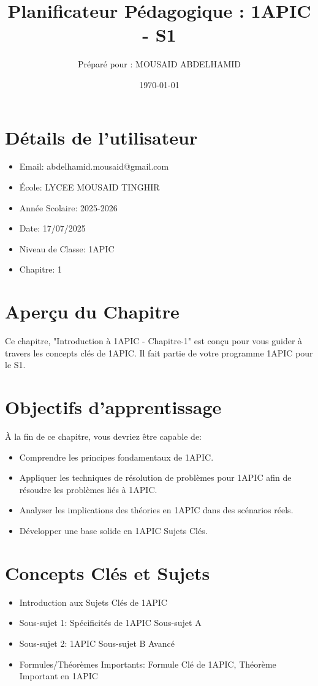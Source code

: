 \documentclass{article}
\title{Planificateur Pédagogique : 1APIC - S1}
\author{Préparé pour : MOUSAID ABDELHAMID}
\date{\today}
\begin{document}
\maketitle

\section*{Détails de l'utilisateur}
\begin{itemize}
    \item Email: abdelhamid.mousaid@gmail.com
    \item École: LYCEE MOUSAID TINGHIR
    \item Année Scolaire: 2025-2026
    \item Date: 17/07/2025
    \item Niveau de Classe: 1APIC
    \item Chapitre: 1
\end{itemize}

\section*{Aperçu du Chapitre}
Ce chapitre, "Introduction à 1APIC - Chapitre-1" est conçu pour vous guider à travers les concepts clés de 1APIC. Il fait partie de votre programme 1APIC pour le S1.

\section*{Objectifs d'apprentissage}
À la fin de ce chapitre, vous devriez être capable de:
\begin{itemize}
    \item Comprendre les principes fondamentaux de 1APIC.
    \item Appliquer les techniques de résolution de problèmes pour 1APIC afin de résoudre les problèmes liés à 1APIC.
    \item Analyser les implications des théories en 1APIC dans des scénarios réels.
    \item Développer une base solide en 1APIC Sujets Clés.
\end{itemize}

\section*{Concepts Clés et Sujets}
\begin{itemize}
    \item Introduction aux Sujets Clés de 1APIC
    \item Sous-sujet 1: Spécificités de 1APIC Sous-sujet A
    \item Sous-sujet 2: 1APIC Sous-sujet B Avancé
    \item Formules/Théorèmes Importants: Formule Clé de 1APIC, Théorème Important en 1APIC
\end{itemize}
\end{document}
